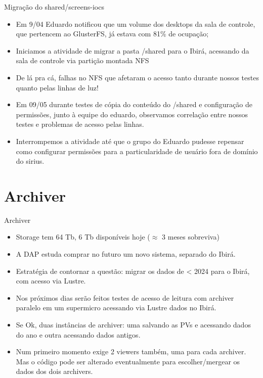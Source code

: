 \documentclass[aspectratio=169]{beamer}            %
\begin{document}
\begin{frame}{Migração do shared/screens-iocs}

{\footnotesize 
\begin{itemize}
    \setlength\itemsep{1em}
    \item Em 9/04 Eduardo notificou que um volume dos desktops da sala de controle, que pertencem ao GlusterFS, já estava com 81\% de ocupação;
    \item Iniciamos a atividade de migrar a pasta /shared para o Ibirá, acessando da sala de controle via partição montada NFS
    \item De lá pra cá, falhas no NFS que afetaram o acesso tanto durante nossos testes quanto pelas linhas de luz!
    \item Em 09/05 durante testes de cópia do conteúdo do /shared e configuração de permissões, junto à equipe do eduardo, observamos correlação entre nossos testes e problemas de acesso pelas linhas.
    \item Interrompemos a atividade até que o grupo do Eduardo pudesse repensar como configurar permissões para a particularidade de usuário fora de domínio do sirius.
\end{itemize}
}

\end{frame}



\section{Archiver}

\begin{frame}{Archiver}

{\footnotesize 
\begin{itemize}
    \setlength\itemsep{1em}
    \item Storage tem 64 Tb, 6 Tb disponíveis hoje ($\approx$ 3 meses sobreviva)
    \item A DAP estuda comprar no futuro um novo sistema, separado do Ibirá.
    \item Estratégia de contornar a questão: migrar os dados de < 2024 para o Ibirá, com acesso via Lustre.
    \item Nos próximos dias serão feitos testes de acesso de leitura com archiver paralelo em um supermicro acessando via Lustre dados no Ibirá.
    \item Se Ok, duas instâncias de archiver: uma salvando as PVs e acessando dados do ano e outra acessando dados antigos.
    \item Num primeiro momento exige 2 viewers também, uma para cada archiver. Mas o código pode ser alterado eventualmente para escolher/mergear os dados dos dois archivers.
\end{itemize}
}

\end{frame}
\end{document}
